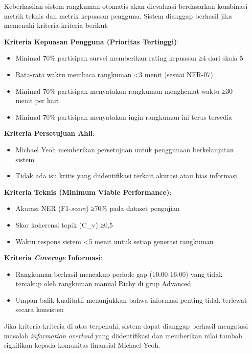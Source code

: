 Keberhasilan sistem rangkuman otomatis akan dievaluasi berdasarkan kombinasi metrik teknis dan metrik kepuasan pengguna. Sistem dianggap berhasil jika memenuhi kriteria-kriteria berikut:

\textbf{Kriteria Kepuasan Pengguna (Prioritas Tertinggi)}:
\begin{itemize}
\item Minimal 70\% partisipan survei memberikan rating kepuasan ≥4 dari skala 5
\item Rata-rata waktu membaca rangkuman <3 menit (sesuai NFR-07)
\item Minimal 70\% partisipan menyatakan rangkuman menghemat waktu ≥30 menit per hari
\item Minimal 70\% partisipan menyatakan ingin rangkuman ini terus tersedia
\end{itemize}

\textbf{Kriteria Persetujuan Ahli}:
\begin{itemize}
\item Michael Yeoh memberikan persetujuan untuk penggunaan berkelanjutan sistem
\item Tidak ada isu kritis yang diidentifikasi terkait akurasi atau bias informasi
\end{itemize}

\textbf{Kriteria Teknis (Minimum Viable Performance)}:
\begin{itemize}
\item Akurasi NER (F1-\textit{score}) ≥70\% pada dataset pengujian
\item Skor koherensi topik (C\_v) ≥0,5
\item Waktu respons sistem <5 menit untuk setiap generasi rangkuman
\end{itemize}

\textbf{Kriteria \textit{Coverage} Informasi}:
\begin{itemize}
\item Rangkuman berhasil mencakup periode gap (10:00-16:00) yang tidak tercakup oleh rangkuman manual Richy di grup Advanced
\item Umpan balik kualitatif menunjukkan bahwa informasi penting tidak terlewat secara konsisten
\end{itemize}

Jika kriteria-kriteria di atas terpenuhi, sistem dapat dianggap berhasil mengatasi masalah \textit{information overload} yang diidentifikasi dan memberikan nilai tambah signifikan kepada komunitas finansial Michael Yeoh.


